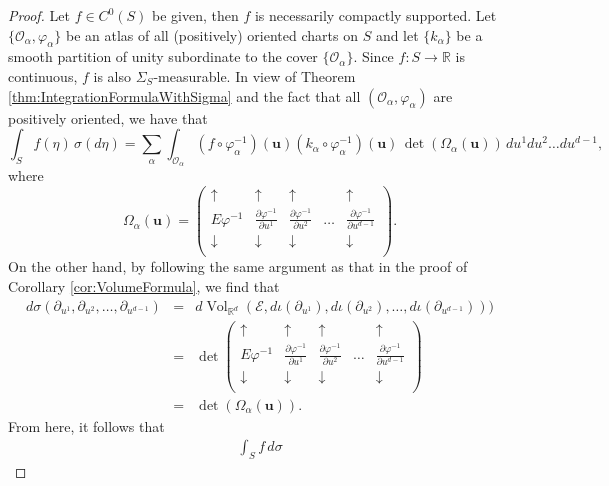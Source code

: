 \documentclass{article}
\renewcommand\det{\operatorname{det}}
\newcommand{\p}{\partial}
\newcommand{\R}{\mathbb{R}}
\newcommand{\al}{\alpha}
\newcommand{\f}[2]{\frac{#1}{#2}}
\theoremstyle{theorem}
\newcommand{\Vol}{\operatorname{Vol}}
\begin{document}
\begin{proof}
Let $f\in C^0(S)$ be given, then $f$ is necessarily compactly supported. Let $\{ \mathcal{O}_\al, \varphi_\al \}$ be an atlas of all (positively) oriented charts on $S$ and let $\{ k_\al\}$ be a smooth partition of unity subordinate to the cover $\{ \mathcal{O}_\al \}$. Since $f : S \to \R$ is continuous, $f$ is also $\Sigma_S$-measurable. In view of Theorem \ref{thm:IntegrationFormulaWithSigma} and the fact that all $(\mathcal{O}_\al, \varphi_\al)$ are positively oriented, we have that
\begin{equation*}
    \int_S f(\eta)\, \sigma(d\eta) = \sum_{\al} \int_{\mathcal{O}_\al} (f\circ \varphi^{-1}_\al)(\mathbf{u}) (k_\al \circ \varphi^{-1}_\al) (\mathbf{u}) \, {\det(\Omega_\al (\mathbf{u}))}\,du^1du^2\dots du^{d-1} ,
\end{equation*}
where
\begin{equation*}
    \Omega_\al(\mathbf{u}) = \begin{pmatrix}
    \uparrow & \uparrow & \uparrow & & \uparrow\\
    E \varphi^{-1} & \f{\p\varphi^{-1}}{\p u^1} & \f{\p\varphi^{-1}}{\p u^2} & \dots & \f{\p\varphi^{-1}}{\p u^{d-1}} \\
    \downarrow & \downarrow & \downarrow & & \downarrow\\
    \end{pmatrix}.
\end{equation*}
On the other hand, by following the same argument as that in the proof of Corollary \ref{cor:VolumeFormula}, we find that
\begin{eqnarray*}
d\sigma(\partial_{u^1},\partial_{u^2},\dots,\partial_{u^{d-1}}) &=& d\Vol_{\mathbb{R}^d}(\mathcal{E},d\iota(\partial_{u^1}),d\iota(\partial_{u^2}),\dots,d\iota(\partial_{u^{d-1}})))\\ 
&=& \det\begin{pmatrix}
    \uparrow & \uparrow & \uparrow & & \uparrow\\
    E \varphi^{-1} & \f{\p\varphi^{-1}}{\p u^1} & \f{\p\varphi^{-1}}{\p u^2} & \dots & \f{\p\varphi^{-1}}{\p u^{d-1}}  \\
    \downarrow & \downarrow & \downarrow & & \downarrow\\
    \end{pmatrix} \\
    &=& \det(\Omega_\al(\mathbf{u})).
\end{eqnarray*}
From here, it follows that
\begin{eqnarray*}
    \int_S f\, d\sigma 

\end{eqnarray*}
\end{proof}
\end{document}
